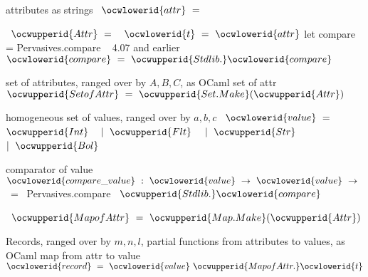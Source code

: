 \documentclass[12pt]{article}
\begin{document}
\label{rellens_types.ml:0}%
attributes as strings 
\ocweol
\label{rellens_types.ml:29}%
\medskip
\ocwbegincode{}\ocwindent{0.00em}
~$\ocwlowerid{attr}~=~$\medskip

\label{rellens_types.ml:49}%
\ocwindent{0.00em}
~$\ocwupperid{Attr}~=~$\ocweol
\ocwindent{1.00em}
~$\ocwlowerid{t}~=~\ocwlowerid{attr}$\ocweol
\ocwindent{0.00em}
\ocwbc{}   let compare = Pervasives.compare \ocwec{}~\ocwbc{} 4.07  and earlier \ocwec{}\ocweol
\ocwindent{1.00em}
~$\ocwlowerid{compare}~=~\ocwupperid{Stdlib.}\ocwlowerid{compare}~$\ocweol
\ocwindent{0.00em}
\medskip

\ocwendcode{}\ocwindent{0.00em}
set of attributes, ranged over by $A,B,C$, as OCaml set of attr 
\ocweol
\label{rellens_types.ml:258}%
\medskip
\ocwbegincode{}\ocwindent{0.00em}
~$\ocwupperid{SetofAttr}~=~\ocwupperid{Set.Make}(\ocwupperid{Attr})$\medskip

\ocwendcode{}\ocwindent{0.00em}
homogeneous set of values, ranged over by $a,b,c$ 
\ocweol
\label{rellens_types.ml:349}%
\medskip
\ocwbegincode{}\ocwindent{0.00em}
~$\ocwlowerid{value}~=$\ocweol
\ocwindent{2.00em}
$\ocwupperid{Int}~$~\ocweol
\ocwindent{1.00em}
$\mid{}~\ocwupperid{Flt}~$~\ocweol
\ocwindent{1.00em}
$\mid{}~\ocwupperid{Str}~$~\ocweol
\ocwindent{1.00em}
$\mid{}~\ocwupperid{Bol}~$~\medskip

\ocwendcode{}\ocwindent{0.00em}
comparator of value 
\ocweol
\label{rellens_types.ml:455}%
\medskip
\ocwbegincode{}\ocwindent{0.00em}
~$\ocwlowerid{compare\_value}~:~\ocwlowerid{value}~\rightarrow{}~\ocwlowerid{value}~\rightarrow{}~$~=~\ocwbc{} Pervasives.compare \ocwec{}~$\ocwupperid{Stdlib.}\ocwlowerid{compare}$\medskip

\label{rellens_types.ml:540}%
\ocwindent{0.00em}
~$\ocwupperid{MapofAttr}~=~\ocwupperid{Map.Make}(\ocwupperid{Attr})$\medskip

\ocwendcode{}\ocwindent{0.00em}
Records, ranged over by $m,n,l$, partial functions from attributes to values,
  as  OCaml map from  attr to value 
\ocweol
\label{rellens_types.ml:695}%
\medskip
\ocwbegincode{}\ocwindent{0.00em}
~$\ocwlowerid{record}~=~\ocwlowerid{value}~\ocwupperid{MapofAttr.}\ocwlowerid{t}$\medskip
\end{document}
